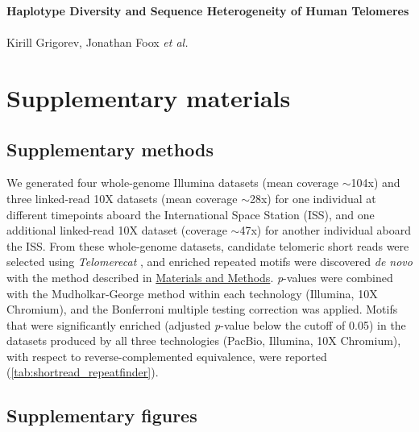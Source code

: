 \documentclass{article}
\begin{document}
\singlespacing
{}
\begin{center}
    \LARGE{\textbf{Haplotype Diversity and Sequence Heterogeneity of Human Telomeres}}
    \\~\\
    \small{Kirill Grigorev, Jonathan Foox \textit{et al.}}
\section*{Supplementary materials}
\end{center}
\doublespacing

\subsection*{Supplementary methods}  \label{sec:supp_methods}

We generated four whole-genome Illumina datasets (mean coverage $\sim$104x)
and three linked-read 10X datasets (mean coverage $\sim$28x)
for one individual at different timepoints aboard the International Space Station (ISS),
and one additional linked-read 10X dataset (coverage $\sim$47x) for another individual aboard the ISS.
From these whole-genome datasets, candidate telomeric short reads were selected using \textit{Telomerecat} \cite{telomerecat},
and enriched repeated motifs were discovered \textit{de novo} with the method described in \hyperref[sec:methods]{Materials and Methods}.
\textit{p}-values were combined with the Mudholkar-George method \cite{george} within each technology (Illumina, 10X Chromium),
and the Bonferroni multiple testing correction was applied.
Motifs that were significantly enriched (adjusted \textit{p}-value below the cutoff of 0.05) in the datasets produced by all three technologies (PacBio, Illumina, 10X Chromium), with respect to reverse-complemented equivalence, were reported (\autoref{tab:shortread_repeatfinder}).

\pagebreak

\subsection*{Supplementary figures}  \label{sec:supp_figs}
\end{document}

